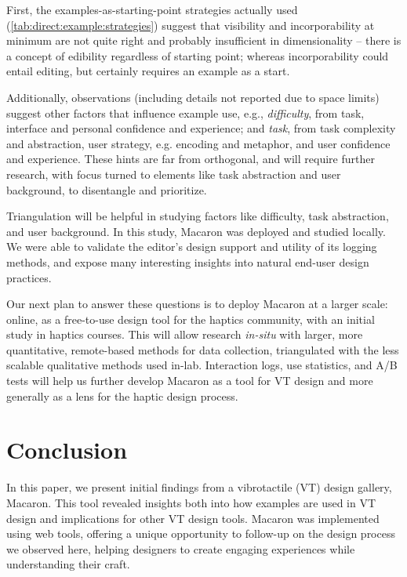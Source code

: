 First, the examples-as-starting-point strategies actually used (\autoref{tab:direct:example:strategies}) suggest that visibility and incorporability at minimum are not quite right and probably insufficient in dimensionality -- there is a concept of edibility regardless of starting point; whereas incorporability could entail editing, but certainly requires an example as a start.

Additionally, observations (including details not reported due to space limits) suggest other factors that influence example use, e.g., 
 \emph{difficulty}, from task, interface and personal confidence and experience; and
 \emph{task}, from task complexity and abstraction, user strategy, e.g. encoding and metaphor, and user confidence and experience. 
These hints are far from orthogonal, and will require further research, with focus turned to elements like task abstraction and user background, to disentangle and prioritize. 

Triangulation will be helpful in studying factors like difficulty, task abstraction, and user background.
In this study, Macaron was deployed and studied locally.
We were able to validate the editor's design support and utility of its logging methods, and expose many interesting insights into natural end-user design practices.

Our next plan to answer these questions is to deploy Macaron at a larger scale: online, as a free-to-use design tool for the haptics community, with an initial study in haptics courses.
This will allow research \emph{in-situ} with larger, more quantitative, remote-based methods for data collection, triangulated with the less scalable qualitative methods used in-lab.
Interaction logs, use statistics, and A/B tests will help us further develop Macaron as  a tool for VT design and more generally as a lens for the haptic design process.


\section{Conclusion}
In this paper, we present initial findings from a vibrotactile (VT) design gallery, Macaron.
This tool revealed insights both into how examples are used in VT design and implications for other VT design tools.
Macaron was implemented using web tools, offering a unique opportunity to follow-up on the design process we observed here, helping designers to create engaging experiences while understanding their craft.



\endinput
